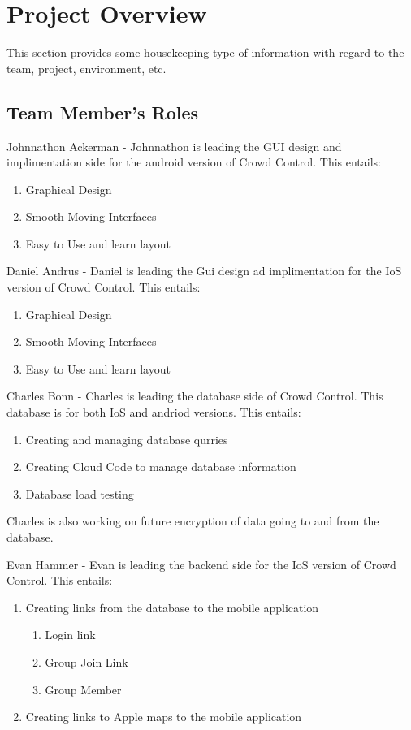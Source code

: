 

\chapter{Project Overview}
This section provides some housekeeping type of information with regard to the 
team, project, environment, etc. 



\section{Team Member's Roles}

Johnnathon Ackerman - Johnnathon is leading the GUI design and implimentation side for the android version of Crowd Control. This entails: 
	\begin {enumerate}
	\item Graphical Design
	\item Smooth Moving Interfaces
	\item Easy to Use and learn layout
	\end{enumerate}

Daniel Andrus - Daniel is leading the Gui design ad implimentation for the IoS version of Crowd Control. This entails:
	\begin {enumerate}
	\item Graphical Design
	\item Smooth Moving Interfaces
	\item Easy to Use and learn layout
	\end{enumerate}

Charles Bonn - Charles is leading the database side of Crowd Control. This database is for both IoS and andriod versions. This entails:
	\begin{enumerate}
	\item Creating and managing database qurries 
	\item Creating Cloud Code to manage database information
	\item Database load testing
	\end{enumerate}
Charles is also working on future encryption of data going to and from the database.
\newline

Evan Hammer - Evan is leading the backend side for the IoS version of Crowd Control. This entails:
	\begin{enumerate}
	\item Creating links from the database to the mobile application
		\begin{enumerate}
		\item Login link
		\item Group Join Link
		\item Group Member
		\end{enumerate}
	\item Creating links to Apple maps to the mobile application
	\end{enumerate}

